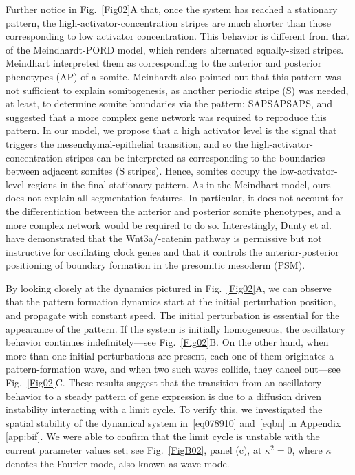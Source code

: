 \documentclass[%
 preprint,
 aip, 
 amsmath,amssymb,
]{revtex4-2}
\begin{document}
Further notice in Fig.~\ref{Fig02}A that, once the system has reached a stationary pattern, the high-activator-concentration stripes are much shorter than those corresponding to low activator concentration. This behavior is different from that of the Meindhardt-PORD model, which renders alternated equally-sized stripes. Meindhart interpreted them as corresponding to the anterior and posterior phenotypes (AP) of a somite. Meinhardt also pointed out that this pattern was not sufficient to explain somitogenesis, as another periodic stripe (S) was needed, at least, to determine somite boundaries via the pattern: SAPSAPSAPS, and suggested that a more complex gene network was required to reproduce this pattern. In our model, we propose that a high activator level is the signal that triggers the mesenchymal-epithelial transition, and so the high-activator-concentration stripes can be interpreted as corresponding to the boundaries between adjacent somites (S stripes). Hence, somites occupy the low-activator-level regions in the final stationary pattern. As in the Meindhart model, ours does not explain all segmentation features. In particular, it does not account for the differentiation between the anterior and posterior somite phenotypes, and a more complex network would be required to do so. Interestingly, Dunty et al. \cite{Dunty2008} have demonstrated that the Wnt3a/\textbeta -catenin pathway is permissive but not instructive for oscillating clock genes and that it controls the anterior-posterior positioning of boundary formation in the presomitic mesoderm (PSM). 

By looking closely at the dynamics pictured in Fig.~\ref{Fig02}A, we can observe that the pattern formation dynamics start at the initial perturbation position, and propagate with constant speed. The initial perturbation is essential for the appearance of the pattern. If the system is initially homogeneous, the oscillatory behavior continues indefinitely---see Fig.~\ref{Fig02}B. On the other hand, when more than one initial perturbations are present, each one of them originates a pattern-formation wave, and when two such waves collide, they cancel out---see Fig.~\ref{Fig02}C. These results suggest that the transition from an oscillatory behavior to a steady pattern of gene expression is due to a diffusion driven instability interacting with a limit cycle. To verify this, we investigated the spatial stability of the dynamical system in~\eqref{eq078910} and~\eqref{eqbn} in Appendix \ref{app:bif}. We were able to confirm that the limit cycle is unstable with the current parameter values set; see Fig.~\ref{FigB02}, panel (c), at $\kappa^2=0$, where $\kappa$ denotes the Fourier mode, also known as wave mode.
	
\end{document}
